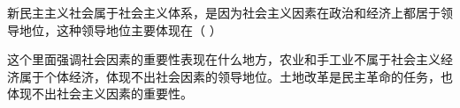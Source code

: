 \question 新民主主义社会属于社会主义体系，是因为社会主义因素在政治和经济上都居于领导地位，这种领导地位主要体现在（
）
\par{}
\begin{solution}这个里面强调社会因素的重要性表现在什么地方，农业和手工业不属于社会主义经济属于个体经济，体现不出社会因素的领导地位。土地改革是民主革命的任务，也体现不出社会主义因素的重要性。
\end{solution}
